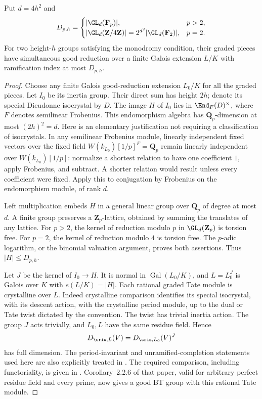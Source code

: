 \begin{lemma}
\label{lem:B-RD17-degree}
Put $d=4h^2$ and
\[
 D_{p,h}=
 \begin{cases}
  |\GL_d(\mathbf F_p)|,&p>2,\\
  |\GL_d(\mathbf Z/4\mathbf Z)|
     =2^{d^2}|\GL_d(\mathbf F_2)|,&p=2.
 \end{cases}
\]
For two height-$h$ groups satisfying the monodromy condition, their
graded pieces have simultaneous good reduction over a finite Galois
extension $L/K$ with ramification index at most $D_{p,h}$.
\end{lemma}
\begin{proof}
Choose any finite Galois good-reduction extension $L_0/K$ for all
the graded pieces. Let $I_0$ be its inertia group. Their direct sum
has height $2h$; denote its special Dieudonne isocrystal by $D$.
The image $H$ of $I_0$ lies in
$\End_F(D)^\times$, where $F$ denotes semilinear Frobenius.
This endomorphism algebra has $\mathbf Q_p$-dimension at most
$(2h)^2=d$. Here is an elementary justification not requiring a
classification of isocrystals. In any semilinear Frobenius module,
linearly independent fixed vectors over the fixed field
$W(k_{L_0})[1/p]^{F}=\mathbf Q_p$ remain linearly independent over
$W(k_{L_0})[1/p]$: normalize a shortest relation to have one
coefficient $1$, apply Frobenius, and subtract. A shorter relation
would result unless every coefficient were fixed. Apply this to
conjugation by Frobenius on the endomorphism module, of rank $d$.

Left multiplication embeds $H$ in a general linear group over
$\mathbf Q_p$ of degree at most $d$. A finite group preserves a
$\mathbf Z_p$-lattice, obtained by summing the translates of any
lattice. For $p>2$, the kernel of reduction modulo $p$ in
$\GL_d(\mathbf Z_p)$ is torsion free. For $p=2$, the kernel of
reduction modulo $4$ is torsion free. The $p$-adic logarithm, or the
binomial valuation argument, proves both assertions. Thus
$|H|\leq D_{p,h}$.

Let $J$ be the kernel of $I_0\to H$. It is normal in
$\operatorname{Gal}(L_0/K)$, and $L=L_0^J$ is Galois over $K$ with
$e(L/K)=|H|$. Each rational graded Tate module is crystalline over
$L$. Indeed crystalline comparison identifies its special
isocrystal, with its descent action, with the crystalline period
module, up to the dual or Tate twist dictated by the convention.
The twist has trivial inertia action. The group $J$ acts trivially,
and $L_0,L$ have the same residue field. Hence
\[
 D_{\cris,L}(V)=D_{\cris,L_0}(V)^J
\]
has full dimension. The period-invariant and unramified-completion
statements used here are also explicitly treated in
\cite[\S\S5.1.5--5.1.7, pp.156--158]{Fontaine1994Semi}.
The required comparison, including functoriality,
is given in \cite[Lemma~2.2.4 and the proof of Corollary~2.2.6]{Kisin2006Crystalline}.
Corollary~2.2.6 of that paper, valid for arbitrary perfect residue
field and every prime, now gives a good BT group with this rational
Tate module.


\end{proof}
